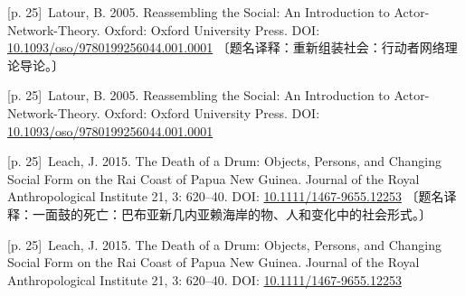 \documentclass[10pt,a4paper]{article}
\begin{document}
\noindent\begin{minipage}{\textwidth}\begin{minipage}[t]{\dimexpr.5\textwidth-4mm\relax}\noindent\begin{minipage}[t]{\linewidth}{\scriptsize\color{gray} [p. 25]}\ Latour, B. 2005. Reassembling the Social: An Introduction to Actor-Network-Theory. Oxford: Oxford University Press. DOI: \url{10.1093/oso/9780199256044.001.0001} 〔题名译释：重新组装社会：行动者网络理论导论。〕\par\end{minipage}\par\end{minipage}\hfill\begin{minipage}[t]{\dimexpr.5\textwidth-4mm\relax}\noindent\begin{minipage}[t]{\linewidth}{\scriptsize\color{gray} [p. 25]}\ Latour, B. 2005. Reassembling the Social: An Introduction to Actor-Network-Theory. Oxford: Oxford University Press. DOI: \url{10.1093/oso/9780199256044.001.0001}\par\end{minipage}\par\end{minipage}\end{minipage}\par
\noindent\begin{minipage}{\textwidth}\begin{minipage}[t]{\dimexpr.5\textwidth-4mm\relax}\noindent\begin{minipage}[t]{\linewidth}{\scriptsize\color{gray} [p. 25]}\ Leach, J. 2015. The Death of a Drum: Objects, Persons, and Changing Social Form on the Rai Coast of Papua New Guinea. Journal of the Royal Anthropological Institute 21, 3: 620–40. DOI: \url{10.1111/1467-9655.12253} 〔题名译释：一面鼓的死亡：巴布亚新几内亚赖海岸的物、人和变化中的社会形式。〕\par\end{minipage}\par\end{minipage}\hfill\begin{minipage}[t]{\dimexpr.5\textwidth-4mm\relax}\noindent\begin{minipage}[t]{\linewidth}{\scriptsize\color{gray} [p. 25]}\ Leach, J. 2015. The Death of a Drum: Objects, Persons, and Changing Social Form on the Rai Coast of Papua New Guinea. Journal of the Royal Anthropological Institute 21, 3: 620–40. DOI: \url{10.1111/1467-9655.12253}\par\end{minipage}\par\end{minipage}\end{minipage}\par
\end{document}
